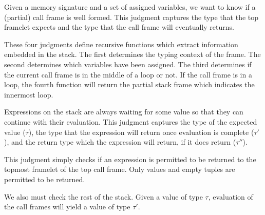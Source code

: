Given a memory signature and a set of assigned variables, we want to know if a (partial) call frame is well formed. This judgment captures the type that the top framelet expects and the type that the call frame will eventually returns.

\begin{mathpar}



\end{mathpar}

These four judgments define recursive functions which extract information embedded in the stack. The first determines the typing context of the frame. The second determines which variables have been assigned. The third determines if the current call frame is in the middle of a loop or not. If the call frame is in a loop, the fourth function will return the partial stack frame which indicates the innermost loop.

\begin{mathpar}
\end{mathpar}

Expressions on the stack are always waiting for some value so that they can continue with their evaluation. This judgment captures the type of the expected value ($\tau$), the type that the expression will return once evaluation is complete ($\tau'$), and the return type which the expression will return, if it does return ($\tau''$).

\begin{mathpar}
\end{mathpar}

This judgment simply checks if an expression is permitted to be returned to the topmost framelet of the top call frame. Only values and empty tuples are permitted to be returned.

\begin{mathpar}
\end{mathpar}

We also must check the rest of the stack. Given a value of type $\tau$, evaluation of the call frames will yield a value of type $\tau'$.

\begin{mathpar}
\end{mathpar}

